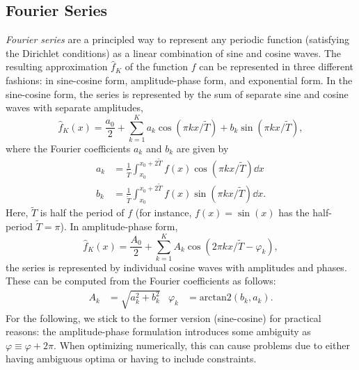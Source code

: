 \subsection{Fourier Series}
	\emph{Fourier series} are a principled way to represent any periodic function (satisfying the Dirichlet conditions\cite{oppenheimSignalsSystems1997}) as a linear combination of sine and cosine waves.
	The resulting approximation $\hat{f}_K$ of the function $f$ can be represented in three different fashions: in sine-cosine form, amplitude-phase form, and exponential form.
	In the sine-cosine form, the series is represented by the sum of separate sine and cosine waves with separate amplitudes,
	\begin{equation}
		\hat{f}_K(x) = \frac{a_0}{2} + \sum_{k = 1}^{K} a_k \cos(\pi k x / \tilde{T}) + b_k \sin(\pi k x / \tilde{T}),
		\label{eq:sineCosineFourierSeries}
	\end{equation}
	where the Fourier coefficients $a_k$ and $b_k$ are given by
	\begin{align}
		a_k &= \frac{1}{\tilde{T}} \int_{x_0}^{x_0 + 2\tilde{T}} f(x) \cos(\pi k x / \tilde{T}) \dd{x} \\
		b_k &= \frac{1}{\tilde{T}} \int_{x_0}^{x_0 + 2\tilde{T}} f(x) \sin(\pi k x / \tilde{T}) \dd{x}.
	\end{align}
	Here, $\tilde{T}$ is half the period of $f$ (for instance, $f(x) = \sin(x)$ has the half-period $\tilde{T} = \pi$).
	In amplitude-phase form,
	\begin{equation}
		\hat{f}_K(x) = \frac{A_0}{2} + \sum_{k = 1}^{K} A_k \cos(2 \pi k x / \tilde{T} - \varphi_k),
	\end{equation}
	the series is represented by individual cosine waves with amplitudes and phases.
	These can be computed from the Fourier coefficients as follows:
	\begin{align}
		A_k &= \sqrt{a_k^2 + b_k^2} &
		\varphi_k &= \mathrm{arctan2}(b_k, a_k).
	\end{align}
	For the following, we stick to the former version (sine-cosine) for practical reasons:
	the amplitude-phase formulation introduces some ambiguity as $\varphi \equiv \varphi + 2\pi$.
	When optimizing numerically, this can cause problems due to either having ambiguous optima or having to include constraints.

